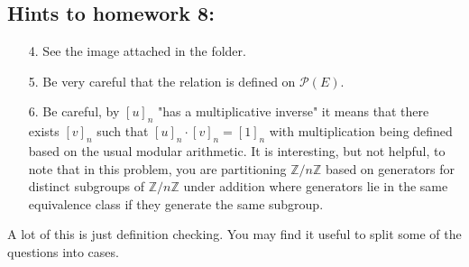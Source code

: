 \documentclass[letterpaper,12pt]{article}
\begin{document}
\subsection*{Hints to homework 8:}
\begin{enumerate}
\item[4.] See the image attached in the folder.
\item[5.] Be very careful that the relation is defined on $\mathcal{P}(E)$. 
\item[6.] Be careful, by $[u]_n$ "has a multiplicative inverse" it means that there exists $[v]_n$ such that $[u]_n\cdot [v]_n = [1]_n$ with multiplication being defined based on the usual modular arithmetic. It is interesting, but not helpful, to note that in this problem, you are partitioning $\mathbb{Z}/n\mathbb{Z}$ based on generators for distinct subgroups of $\mathbb{Z}/n\mathbb{Z}$ under addition where generators lie in the same equivalence class if they generate the same subgroup.
\end{enumerate}
A lot of this is just definition checking. You may find it useful to split some of the questions into cases.
\end{document}
